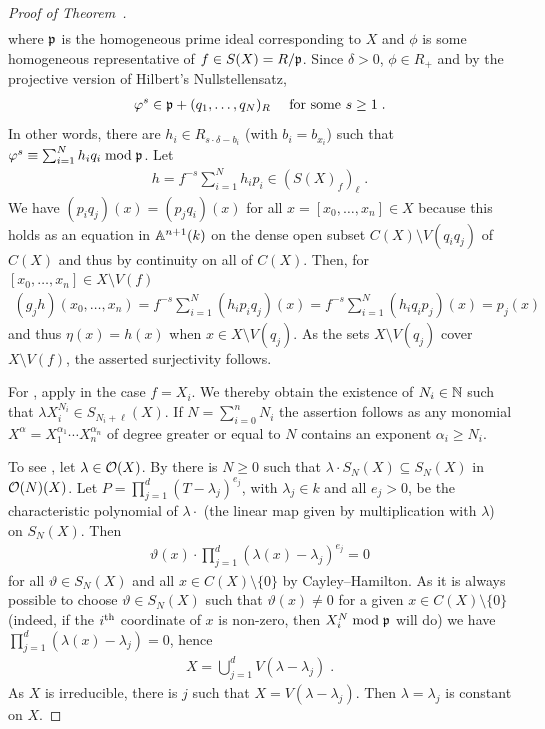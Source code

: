\documentclass[a4paper,parskip=half,numbers=enddot, DIV=12]{scrreprt}
\begin{document}
\begin{proof}[Proof of Theorem~]
\begin{align*}
    \end{align*}
    where $\mathfrak{p}$ is the homogeneous prime ideal corresponding to $X$ and $\phi$ is some homogeneous representative of $f\in S(X) = R/\mathfrak{p}$. Since $\delta >0$, $\phi\in R_+$ and by the projective version of Hilbert's Nullstellensatz, 
    \begin{align*}
        \varphi^s \in  \mathfrak{p}+(q_1,\ldots,q_N)_R\quad\text{ for some }s\geq 1\;.
    \end{align*}
    In other words, there are $h_i\in R_{s\cdot \delta-b_i}$ (with $b_i=b_{x_i}$) such that $\varphi^s\equiv \sum_{i=1}^N h_iq_i \bmod\mathfrak{p}$. Let 
    \begin{align*}
    	h= f^{-s}\sum_{i=1}^N h_ip_i\in (S(X)_f)_\ell\;.
    \end{align*}
    We have $(p_i q_j)(x) = (p_jq_i)(x)$ for all $x=[x_0,\ldots,x_n]\in X$ because this holds as an equation in $\mathbb{A}^{n+1}(k)$ on the dense open subset $C(X)\setminus V(q_iq_j)$ of $C(X)$ and thus by continuity on all of $C(X)$. Then, for $[x_0,\ldots, x_n]\in X\setminus V(f)$ 
    \begin{align*}
        (g_jh)(x_0,\ldots, x_n) = f^{-s}\sum_{i=1}^N (h_ip_iq_j)(x)= f^{-s}\sum_{i=1}^N (h_iq_ip_j)(x) = p_j(x)
    \end{align*}
    and thus $\eta(x) = h(x)$ when $x\in X\setminus V(q_j)$. As the sets $X\setminus V(q_j)$ cover $X\setminus V(f)$, the asserted surjectivity follows.
    
    For , apply  in the case $f=X_i$. We thereby obtain the existence of $N_i\in\mathbb{N}$ such that $\lambda X_i^{N_i}\in S_{N_i+\ell}(X)$. If $N = \sum_{i=0}^n N_i$ the assertion follows as any monomial $X^\alpha=X_1^{\alpha_1}\cdots X_n^{\alpha_n}$ of degree greater or equal to $N$ contains an exponent $\alpha_i\geq N_i$.
    
    To see , let $\lambda\in \mathcal{O}(X)$. By  there is $N\geq 0$ such that $\lambda\cdot S_N(X) \subseteq S_N(X)$ in $\mathcal{O}(N)(X)$. Let $P = \prod_{j=1}^d (T-\lambda_j)^{e_j}$, with $\lambda_j\in k$ and all $e_j>0$, be the characteristic polynomial of $\lambda\cdot$ (the linear map given by multiplication with $\lambda$) on $S_N(X)$. Then 
    \begin{align*}
    	 \vartheta(x)\cdot\prod_{j=1}^d (\lambda(x)-\lambda_j)^{e_j} = 0
    \end{align*}
   for all $\vartheta\in S_N(X)$ and all $x\in C(X)\setminus \{0\}$ by Cayley--Hamilton. As it is always possible to choose $\vartheta\in S_N(X)$ such that $\vartheta(x)\neq0$ for a given $x\in C(X)\setminus\{0\}$ (indeed, if the $i^{\text{th}}$ coordinate of $x$ is non-zero, then $X_i^N\bmod\mathfrak{p}$ will do) we have $\prod_{j=1}^d (\lambda(x)-\lambda_j) = 0$, hence 
   \begin{align*}
   	X = \bigcup_{j=1}^d V(\lambda-\lambda_j)\;. 
   \end{align*}
   As $X$ is irreducible, there is $j$ such that $X = V(\lambda-\lambda_j)$. Then $\lambda=\lambda_j$ is constant on $X$. 
\end{proof}
\end{document}
